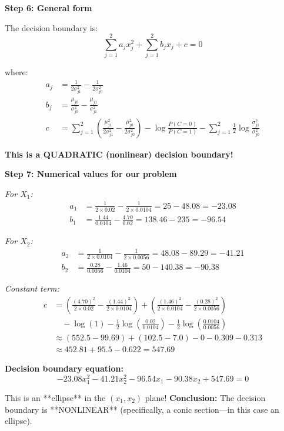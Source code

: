 \documentclass[12pt]{article}
\begin{document}
\begin{solution}
\textbf{Step 6: General form}

The decision boundary is:
\[
\boxed{\sum_{j=1}^{2} a_j x_j^2 + \sum_{j=1}^{2} b_j x_j + c = 0}
\]

where:
\begin{align}
a_j &= \frac{1}{2\sigma_{j1}^2} - \frac{1}{2\sigma_{j0}^2} \\
b_j &= \frac{\mu_{j0}}{\sigma_{j0}^2} - \frac{\mu_{j1}}{\sigma_{j1}^2} \\
c &= \sum_{j=1}^{2}\left(\frac{\mu_{j1}^2}{2\sigma_{j1}^2} - \frac{\mu_{j0}^2}{2\sigma_{j0}^2}\right) - \log \frac{P(C=0)}{P(C=1)} - \sum_{j=1}^{2} \frac{1}{2}\log \frac{\sigma_{j1}^2}{\sigma_{j0}^2}
\end{align}

\textbf{This is a QUADRATIC (nonlinear) decision boundary!}

\textbf{Step 7: Numerical values for our problem}

\textit{For $X_1$:}
\begin{align}
a_1 &= \frac{1}{2 \times 0.02} - \frac{1}{2 \times 0.0104} = 25 - 48.08 = -23.08 \\
b_1 &= \frac{1.44}{0.0104} - \frac{4.70}{0.02} = 138.46 - 235 = -96.54
\end{align}

\textit{For $X_2$:}
\begin{align}
a_2 &= \frac{1}{2 \times 0.0104} - \frac{1}{2 \times 0.0056} = 48.08 - 89.29 = -41.21 \\
b_2 &= \frac{0.28}{0.0056} - \frac{1.46}{0.0104} = 50 - 140.38 = -90.38
\end{align}

\textit{Constant term:}
\begin{align}
c &= \left(\frac{(4.70)^2}{2 \times 0.02} - \frac{(1.44)^2}{2 \times 0.0104}\right) + \left(\frac{(1.46)^2}{2 \times 0.0104} - \frac{(0.28)^2}{2 \times 0.0056}\right) \\
&\quad - \log(1) - \frac{1}{2}\log\left(\frac{0.02}{0.0104}\right) - \frac{1}{2}\log\left(\frac{0.0104}{0.0056}\right) \\
&\approx (552.5 - 99.69) + (102.5 - 7.0) - 0 - 0.309 - 0.313 \\
&\approx 452.81 + 95.5 - 0.622 = 547.69
\end{align}

\textbf{Decision boundary equation:}
\[
\boxed{-23.08 x_1^2 - 41.21 x_2^2 - 96.54 x_1 - 90.38 x_2 + 547.69 = 0}
\]

This is an **ellipse** in the $(x_1, x_2)$ plane!
\textbf{Conclusion:} The decision boundary is **NONLINEAR** (specifically, a conic section—in this case an ellipse).
\end{solution}
\end{document}
